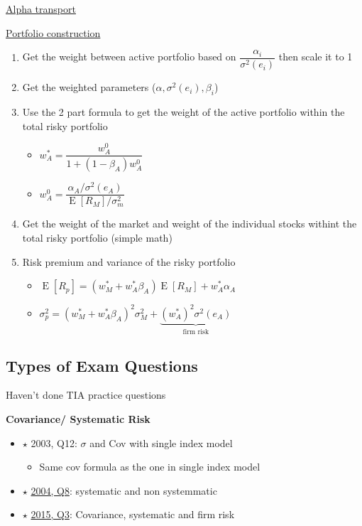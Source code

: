 \documentclass[]{book}
\providecommand{\tightlist}{%
  \setlength{\itemsep}{0pt}\setlength{\parskip}{0pt}}
\theoremstyle{definition}
\theoremstyle{definition}
\theoremstyle{remark}
\begin{document}
\protect\hyperlink{alpha}{Alpha transport}

\protect\hyperlink{ptf-construct}{Portfolio construction}

\begin{enumerate}
\def\labelenumi{\arabic{enumi}.}
\item
  Get the weight between active portfolio based on
  \(\dfrac{\alpha_i}{\sigma^2(e_i)}\) then scale it to 1
\item
  Get the weighted parameters (\(\alpha, \sigma^2(e_i), \beta_i\))
\item
  Use the 2 part formula to get the weight of the active portfolio
  within the total risky portfolio

  \begin{itemize}
  \item
    \(w^*_A = \dfrac{w^0_A}{1 + (1-\beta_A)w^0_A}\)
  \item
    \(w^0_A = \dfrac{ \alpha_A / \sigma^2(e_A)}{\operatorname{E}[R_M] / \sigma^2_m}\)
  \end{itemize}
\item
  Get the weight of the market and weight of the individual stocks
  withint the total risky portfolio (simple math)
\item
  Risk premium and variance of the risky portfolio

  \begin{itemize}
  \item
    \(\operatorname{E}[R_p] = (w^*_M + w^*_A \beta_A) \operatorname{E}[R_M] + w^*_A \alpha_A\)
  \item
    \(\sigma^2_p = (w^*_M + w^*_A \beta_A)^2 \sigma^2_M + \underbrace{(w^*_A)^2\sigma^2(e_A)}_{\text{firm risk}}\)
  \end{itemize}
\end{enumerate}

\subsection{Types of Exam Questions}\label{types-of-exam-questions-2}

{Haven't done TIA practice questions}

\textbf{Covariance/ Systematic Risk}

\begin{itemize}
\tightlist
\item
  \(\star\) 2003, Q12: \(\sigma\) and Cov with single index model

  \begin{itemize}
  \tightlist
  \item
    Same cov formula as the one in single index model
  \end{itemize}
\item
  \(\star\) \protect\hyperlink{2004-8}{2004, Q8}: systematic and non
  systemmatic
\item
  \(\star\) \protect\hyperlink{2015-3}{2015, Q3}: Covariance, systematic
  and firm risk
\end{itemize}
\end{document}
